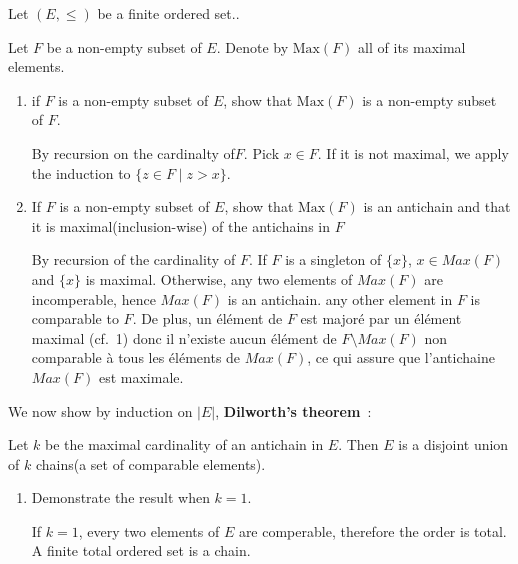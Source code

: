\documentclass[a4paper,11pt]{exam}
\begin{document}
\begin{questions}
		Let $(E, \leq)$  be a finite ordered set..
		
		Let $F$ be a non-empty subset of $ E $. Denote by $\textrm{Max}(F)$ all of its maximal elements.
		
		\begin{enumerate}
			\item if $F$ is a non-empty subset of $E$, show that $\textrm{Max}(F)$
			is a non-empty subset of $F$.
			
			\begin{solution}
				By recursion on the cardinalty of$F$.
				Pick $x \in F$. If it is not maximal, we apply
				the induction to
				$\{ z \in F \mid z>x \}$.
			\end{solution}
			
			\item If $F$ is a non-empty subset of $E$, show that $\textrm{Max}(F)$ is an antichain and that it is maximal(inclusion-wise) of the antichains in $F$
			
			\begin{solution}
				By recursion of the cardinality of $F$.
				If $F$ is a singleton of $\{x\}$, $x \in Max(F)$ and $\{x\}$ is
				maximal.
				Otherwise, any two elements of $Max(F)$ are incomperable, hence
				$Max(F)$ is an antichain.
				any other element in $F$ is comparable to $F$.
				De plus, un élément de $F$ est majoré par un élément maximal (cf.\ 1)
				donc il n'existe aucun élément de $F \setminus Max(F)$ non comparable à
				tous les éléments de $Max(F)$, ce qui assure que l'antichaine $Max(F)$
				est maximale.
			\end{solution}
		\end{enumerate}
		
		We now show by induction on $|E|$,  \textbf{Dilworth’s theorem}~: 
		
		Let $k$ be the maximal cardinality of an antichain in $E$.
		Then $E$ is a disjoint union of $k$ chains(a set of comparable elements).
		\begin{enumerate}[resume]
			\item Demonstrate the result when $k=1$.
			
			\begin{solution}
				If $k=1$, every two elements of $E$ are comperable, therefore the order is total.
				A finite total ordered set is a chain.
			\end{solution}
			

\end{enumerate}
\end{questions}
\end{document}
